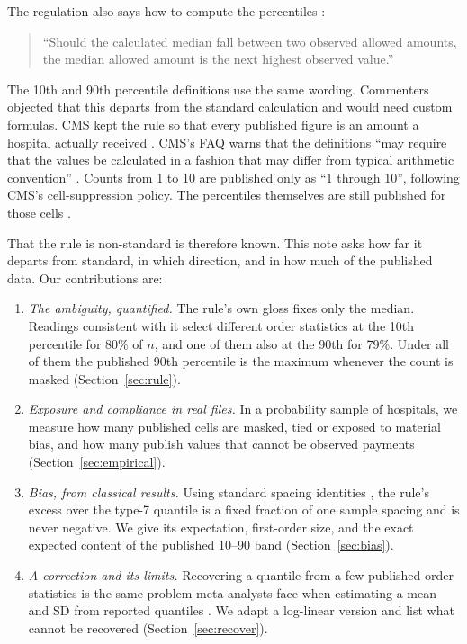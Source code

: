 \documentclass[11pt]{article}
\theoremstyle{remark}
\begin{document}
The regulation also says how to compute the percentiles \citep{ecfr180}:
\begin{quote}
``Should the calculated median fall between two observed allowed amounts, the median allowed amount is the next highest observed value.''
\end{quote}
The 10th and 90th percentile definitions use the same wording. Commenters objected that this departs from the standard calculation and would need custom formulas. CMS kept the rule so that every published figure is an amount a hospital actually received \citep[][at 53990]{fr2025,hfma2025}. CMS's FAQ warns that the definitions ``may require that the values be calculated in a fashion that may differ from typical arithmetic convention'' \citep{cmsfaq}. Counts from 1 to 10 are published only as ``1 through 10'', following CMS's cell-suppression policy. The percentiles themselves are still published for those cells \citep{cmsdd}.

That the rule is non-standard is therefore known. This note asks how far it departs from standard, in which direction, and in how much of the published data. Our contributions are:
\begin{enumerate}
\item \emph{The ambiguity, quantified.} The rule's own gloss fixes only the median. Readings consistent with it select different order statistics at the 10th percentile for 80\% of $n$, and one of them also at the 90th for 79\%. Under all of them the published 90th percentile is the maximum whenever the count is masked (Section~\ref{sec:rule}).
\item \emph{Exposure and compliance in real files.} In a probability sample of hospitals, we measure how many published cells are masked, tied or exposed to material bias, and how many publish values that cannot be observed payments (Section~\ref{sec:empirical}).
\item \emph{Bias, from classical results.} Using standard spacing identities \citep{pyke1965,davidnagaraja2003,jonesbalakrishnan2002}, the rule's excess over the type-7 quantile is a fixed fraction of one sample spacing and is never negative. We give its expectation, first-order size, and the exact expected content of the published 10--90 band (Section~\ref{sec:bias}).
\item \emph{A correction and its limits.} Recovering a quantile from a few published order statistics is the same problem meta-analysts face when estimating a mean and SD from reported quantiles \citep{hozo2005,wan2014,luo2018,mcgrath2020}. We adapt a log-linear version and list what cannot be recovered (Section~\ref{sec:recover}).
\end{enumerate}
\end{document}
